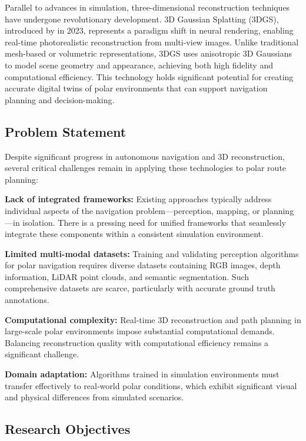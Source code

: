Parallel to advances in simulation, three-dimensional reconstruction techniques have undergone revolutionary development. 3D Gaussian Splatting (3DGS), introduced by \citeauthor{kerbl20233d} in 2023, represents a paradigm shift in neural rendering, enabling real-time photorealistic reconstruction from multi-view images. Unlike traditional mesh-based or volumetric representations, 3DGS uses anisotropic 3D Gaussians to model scene geometry and appearance, achieving both high fidelity and computational efficiency. This technology holds significant potential for creating accurate digital twins of polar environments that can support navigation planning and decision-making.

\subsection{Problem Statement}

Despite significant progress in autonomous navigation and 3D reconstruction, several critical challenges remain in applying these technologies to polar route planning:

\textbf{Lack of integrated frameworks:} Existing approaches typically address individual aspects of the navigation problem---perception, mapping, or planning---in isolation. There is a pressing need for unified frameworks that seamlessly integrate these components within a consistent simulation environment.

\textbf{Limited multi-modal datasets:} Training and validating perception algorithms for polar navigation requires diverse datasets containing RGB images, depth information, LiDAR point clouds, and semantic segmentation. Such comprehensive datasets are scarce, particularly with accurate ground truth annotations.

\textbf{Computational complexity:} Real-time 3D reconstruction and path planning in large-scale polar environments impose substantial computational demands. Balancing reconstruction quality with computational efficiency remains a significant challenge.

\textbf{Domain adaptation:} Algorithms trained in simulation environments must transfer effectively to real-world polar conditions, which exhibit significant visual and physical differences from simulated scenarios.

\subsection{Research Objectives}

